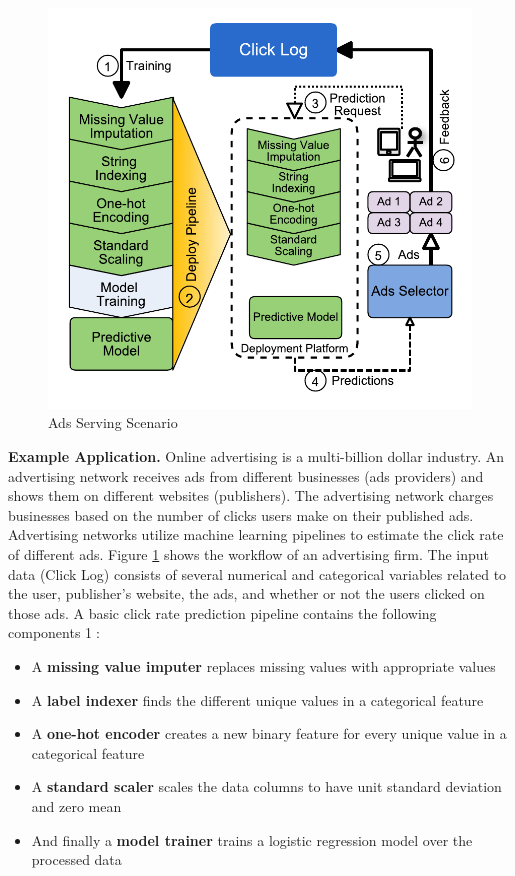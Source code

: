 \begin{figure}[t]
\centering
\includegraphics[width=\columnwidth]{../images/motivational-example.pdf}
\caption{Ads Serving Scenario}
\label{fig:motivational-example}
\end{figure}
\textbf{Example Application.} 
Online advertising is a multi-billion dollar industry.
An advertising network receives ads from different businesses (ads providers) and shows them on different websites (publishers).
The advertising network charges businesses based on the number of clicks users make on their published ads.
Advertising networks utilize machine learning pipelines to estimate the click rate of different ads.
Figure \ref{fig:motivational-example} shows the workflow of an advertising firm.
The input data (Click Log) consists of several numerical and categorical variables related to the user, publisher's website,  the ads,  and whether or not the users clicked on those ads.
A basic click rate prediction pipeline contains the following components \textcircled{1}:
\begin{itemize}
\item A \textbf{missing value imputer} replaces missing values with appropriate values
\item A \textbf{label indexer} finds the different unique values in a categorical feature 
\item A \textbf{one-hot encoder} creates a new binary feature for every unique value in a categorical feature
\item A \textbf{standard scaler} scales the data columns to have unit standard deviation and zero mean
\item And finally a \textbf{model trainer} trains a logistic regression model over the processed data
\end{itemize}
